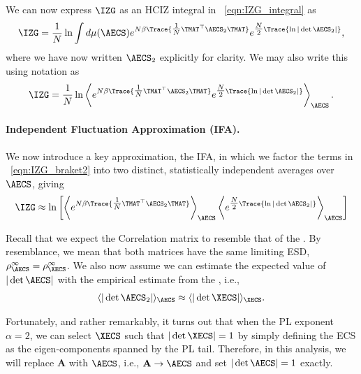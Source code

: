 We can now express $\IZG$ as an HCIZ integral in \EQN~\ref{eqn:IZG_integral} as
\begin{align}
  \label{eqn:IZG_integral2}
  \IZG = \frac{1}{N}
  \ln \int d\mu(\AECS) e^{N\beta \Trace{ \tfrac{1}{N}\TMAT^{\top}\AECS_{2}\TMAT } }
  e^{\tfrac{N}{2}\Trace{\ln|\det\AECS_{2}|}}  ,
\end{align}
where we have now written $\AECS_{2}$ explicitly for clarity.
We may also write this using \BraKet notation as
\begin{align}
  \label{eqn:IZG_braket2}
  \IZG = 
  \frac{1}{N} \ln\left\langle
  e^{N\beta \Trace{ \tfrac{1}{N}\TMAT^{\top}\AECS_{2}\TMAT } }
  e^{\tfrac{N}{2}\Trace{\ln|\det\AECS_{2}|}}
  \right\rangle_{\AECS}  .
\end{align}

\paragraph{Independent Fluctuation Approximation (IFA).}

We now introduce a key approximation, the IFA, 
in which we factor the terms in \EQN~\ref{eqn:IZG_braket2} into two distinct, 
statistically independent averages over $\AECS$, giving
\begin{align}
  \label{eqn:IFA}
  \IZG \approx
  \ln\left[
  \left\langle
  e^{N\beta \Trace{ \tfrac{1}{N}\TMAT^{\top}\AECS_{2}\TMAT } }
  \right\rangle_{\AECS}
  \left\langle
  e^{\tfrac{N}{2}\Trace{\ln|\det\AECS_{2}|}}
  \right\rangle_{\AECS} \right]
\end{align}

\noindent
Recall that we expect the \Student Correlation matrix to resemble that of the \Teacher.
By resemblance, we mean that both matrices have the same limiting ESD, $\rho^{\infty}_{\AECS}=\rho^{\infty}_{\XECS}$.
We also now assume we can estimate the expected value of $|\det\AECS|$ with the empirical estimate
from the \Teacher, i.e.,
\begin{align}
  \langle |\det\AECS_{2}| \rangle_{\AECS}\approx  \langle |\det\XECS| \rangle_{\XECS} .
\end{align}

Fortunately, and rather remarkably, it turns out that when the PL exponent $\alpha=2$, we can
select $\XECS$ such that $|\det\XECS|=1$ by simply defining the ECS as the eigen-components spanned by the PL tail.
Therefore, in this analysis, we will replace $\mathbf{A}$ with $\AECS$, i.e., $\mathbf{A}\rightarrow\AECS$ 
and set $|\det\AECS|=1$ exactly.

